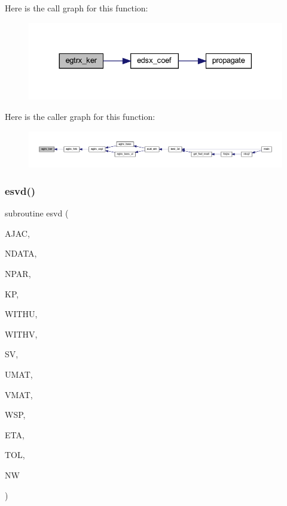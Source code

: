 Here is the call graph for this function\+:\nopagebreak
\begin{figure}[H]
\begin{center}
\leavevmode
\includegraphics[width=330pt]{Leroi_8f90_aed79c3eb3332f2cd1b4c25c6c825e360_cgraph}
\end{center}
\end{figure}
Here is the caller graph for this function\+:\nopagebreak
\begin{figure}[H]
\begin{center}
\leavevmode
\includegraphics[width=350pt]{Leroi_8f90_aed79c3eb3332f2cd1b4c25c6c825e360_icgraph}
\end{center}
\end{figure}
\mbox{\label{Leroi_8f90_a4ee1c663696c56423ddfdd31af7fbaa8}} 
\subsubsection{\texorpdfstring{esvd()}{esvd()}}
{\footnotesize\ttfamily subroutine esvd (\begin{DoxyParamCaption}\item[{real, dimension(ndata,npar+1)}]{A\+J\+AC,  }\item[{integer}]{N\+D\+A\+TA,  }\item[{integer}]{N\+P\+AR,  }\item[{integer}]{KP,  }\item[{logical}]{W\+I\+T\+HU,  }\item[{logical}]{W\+I\+T\+HV,  }\item[{real, dimension(npar)}]{SV,  }\item[{real, dimension(ndata,npar)}]{U\+M\+AT,  }\item[{real, dimension(npar,npar)}]{V\+M\+AT,  }\item[{real, dimension(3$\ast$npar)}]{W\+SP,  }\item[{real}]{E\+TA,  }\item[{real}]{T\+OL,  }\item[{integer}]{NW }\end{DoxyParamCaption})}

